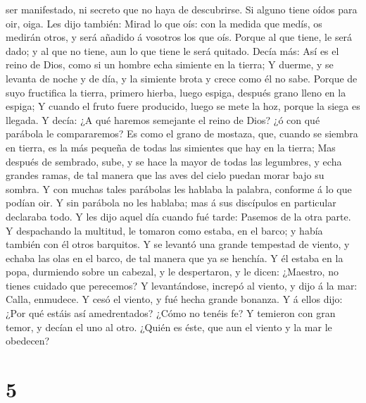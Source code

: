ser manifestado, ni secreto que no haya de descubrirse.  Si
alguno tiene oídos para oir, oiga.  Les dijo también: Mirad
lo que oís: con la medida que medís, os medirán otros, y será añadido á
vosotros los que oís.  Porque al que tiene, le será dado; y
al que no tiene, aun lo que tiene le será quitado.  Decía
más: Así es el reino de Dios, como si un hombre echa simiente en la
tierra;  Y duerme, y se levanta de noche y de día, y la
simiente brota y crece como él no sabe.  Porque de suyo
fructifica la tierra, primero hierba, luego espiga, después grano lleno
en la espiga;  Y cuando el fruto fuere producido, luego se
mete la hoz, porque la siega es llegada.  Y decía: ¿A qué
haremos semejante el reino de Dios? ¿ó con qué parábola le compararemos?
 Es como el grano de mostaza, que, cuando se siembra en
tierra, es la más pequeña de todas las simientes que hay en la tierra;
 Mas después de sembrado, sube, y se hace la mayor de todas
las legumbres, y echa grandes ramas, de tal manera que las aves del
cielo puedan morar bajo su sombra.  Y con muchas tales
parábolas les hablaba la palabra, conforme á lo que podían oir.
 Y sin parábola no les hablaba; mas á sus discípulos en
particular declaraba todo.  Y les dijo aquel día cuando fué
tarde: Pasemos de la otra parte.  Y despachando la
multitud, le tomaron como estaba, en el barco; y había también con él
otros barquitos.  Y se levantó una grande tempestad de
viento, y echaba las olas en el barco, de tal manera que ya se henchía.
 Y él estaba en la popa, durmiendo sobre un cabezal, y le
despertaron, y le dicen: ¿Maestro, no tienes cuidado que perecemos?
 Y levantándose, increpó al viento, y dijo á la mar: Calla,
enmudece. Y cesó el viento, y fué hecha grande bonanza.  Y
á ellos dijo: ¿Por qué estáis así amedrentados? ¿Cómo no tenéis fe?
 Y temieron con gran temor, y decían el uno al otro. ¿Quién
es éste, que aun el viento y la mar le obedecen?

\hypertarget{section-4}{%
\section{5}\label{section-4}}

